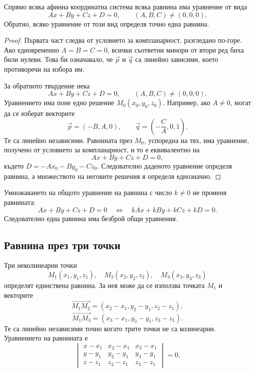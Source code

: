 \begin{keythm}
Спрямо всяка афинна координатна система всяка равнина има уравнение от вида
\[
\boxed{Ax+By+Cz+D=0,\qquad (A,B,C)\ne(0,0,0).}
\]
Обратно, всяко уравнение от този вид определя точно една равнина.
\end{keythm}

\begin{proof}
Първата част следва от условието за компланарност, разгледано по-горе. Ако едновременно $A=B=C=0$, всички съответни минори от втори ред биха били нулеви. Това би означавало, че $\vec p$ и $\vec q$ са линейно зависими, което противоречи на избора им.

За обратното твърдение нека
\[
Ax+By+Cz+D=0,\qquad (A,B,C)\ne(0,0,0).
\]
Уравнението има поне едно решение $M_0(x_0,y_0,z_0)$. Например, ако $A\ne0$, могат да се изберат векторите
\[
\vec p=(-B,A,0),\qquad
\vec q=\left(-\frac CA,0,1\right).
\]
Те са линейно независими. Равнината през $M_0$, успоредна на тях, има уравнение, получено от условието за компланарност, и то е еквивалентно на
\[
Ax+By+Cz+D=0,
\]
където $D=-Ax_0-By_0-Cz_0$. Следователно даденото уравнение определя равнина, а множеството на неговите решения я определя еднозначно.
\end{proof}

\begin{remark}
Умножаването на общото уравнение на равнина с число $k\ne0$ не променя равнината:
\[
Ax+By+Cz+D=0
\quad\Longleftrightarrow\quad
kAx+kBy+kCz+kD=0.
\]
Следователно една равнина има безброй общи уравнения.
\end{remark}

\subsection{Равнина през три точки}\label{s:29.2.2}

Три неколинеарни точки
\[
M_1(x_1,y_1,z_1),\quad
M_2(x_2,y_2,z_2),\quad
M_3(x_3,y_3,z_3)
\]
определят единствена равнина. За нея може да се използва точката $M_1$ и векторите
\[
\overrightarrow{M_1M_2}
=(x_2-x_1,y_2-y_1,z_2-z_1),
\]
\[
\overrightarrow{M_1M_3}
=(x_3-x_1,y_3-y_1,z_3-z_1).
\]
Те са линейно независими точно когато трите точки не са колинеарни. Уравнението на равнината е
\[
\boxed{
\begin{vmatrix}
x-x_1&x_2-x_1&x_3-x_1\\
y-y_1&y_2-y_1&y_3-y_1\\
z-z_1&z_2-z_1&z_3-z_1
\end{vmatrix}=0.}
\]

